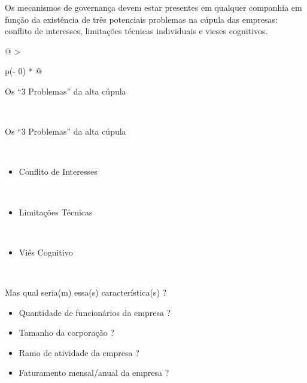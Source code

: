 \documentclass[
]{book}
\providecommand{\tightlist}{%
  \setlength{\itemsep}{0pt}\setlength{\parskip}{0pt}}
\begin{document}
Os mecanismos de governança devem estar presentes em qualquer companhia em função da existência de três potenciais problemas na cúpula das
empresas: conflito de interesses, limitações técnicas individuais e vieses cognitivos.

\begin{longtable}[]{@{}
  >{\raggedright\arraybackslash}p{(\columnwidth - 0\tabcolsep) * }@{}}
\caption{Mas nem todas as empresas vão apresentar necessidade imediata de implantação de uma estrutura de Governança Corporativa. Existem cenários uma característica torna a necessidade da implantação imediata.}\tabularnewline
\toprule\noalign{}
\begin{minipage}[b]{\linewidth}\raggedright
Os ``3 Problemas'' da alta cúpula
\end{minipage} \\
\midrule\noalign{}
\endfirsthead
\toprule\noalign{}
\begin{minipage}[b]{\linewidth}\raggedright
Os ``3 Problemas'' da alta cúpula
\end{minipage} \\
\midrule\noalign{}
\endhead
\bottomrule\noalign{}
\endlastfoot
\begin{minipage}[t]{\linewidth}\raggedright
\begin{itemize}
\tightlist
\item
  Conflito de Interesses
\end{itemize}
\end{minipage} \\
\begin{minipage}[t]{\linewidth}\raggedright
\begin{itemize}
\tightlist
\item
  Limitações Técnicas
\end{itemize}
\end{minipage} \\
\begin{minipage}[t]{\linewidth}\raggedright
\begin{itemize}
\tightlist
\item
  Viés Cognitivo
\end{itemize}
\end{minipage} \\
\end{longtable}

Mas qual seria(m) essa(s) característica(s) ?

\begin{itemize}
\tightlist
\item
  Quantidade de funcionários da empresa ?
\item
  Tamanho da corporação ?
\item
  Ramo de atividade da empresa ?
\item
  Faturamento mensal/anual da empresa ?
\end{itemize}
\end{document}
